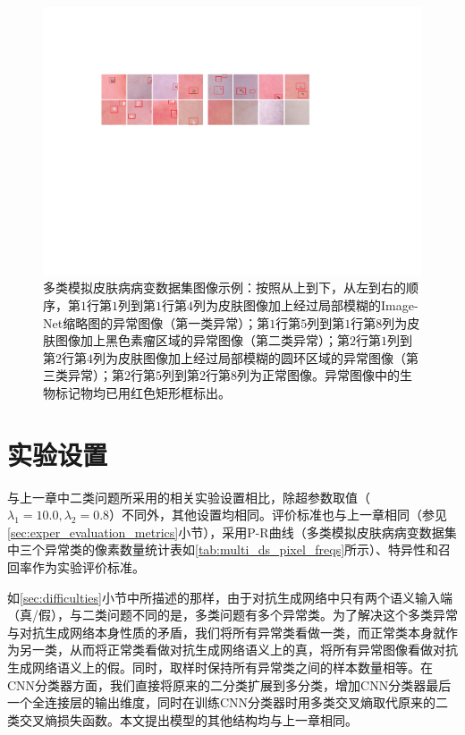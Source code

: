 \begin{figure}[h]
	\centering
	\includegraphics[width=1.0\textwidth]{figure/multi_classes_simulated_skin.pdf}
	\caption{多类模拟皮肤病病变数据集图像示例：按照从上到下，从左到右的顺序，第$1$行第$1$列到第$1$行第$4$列为皮肤图像加上经过局部模糊的Image-Net缩略图的异常图像（第一类异常）；第$1$行第$5$列到第$1$行第$8$列为皮肤图像加上黑色素瘤区域的异常图像（第二类异常）；第$2$行第$1$列到第$2$行第$4$列为皮肤图像加上经过局部模糊的圆环区域的异常图像（第三类异常）；第$2$行第$5$列到第$2$行第$8$列为正常图像。异常图像中的生物标记物均已用红色矩形框标出。}
	\label{fig:mul_classes_simulated_ds}
\end{figure}

\section{实验设置}\label{sec:multi_classes_experiment_setting}
与上一章中二类问题所采用的相关实验设置相比，除超参数取值（$\lambda_{1}=10.0,\lambda_{2}=0.8$）不同外，其他设置均相同。评价标准也与上一章相同（参见\ref{sec:exper_evaluation_metrics}小节），采用P-R曲线（多类模拟皮肤病病变数据集中三个异常类的像素数量统计表如\ref{tab:multi_ds_pixel_freqs}所示）、特异性和召回率作为实验评价标准。

如\ref{sec:difficulties}小节中所描述的那样，由于对抗生成网络中只有两个语义输入端（真/假），与二类问题不同的是，多类问题有多个异常类。为了解决这个多类异常与对抗生成网络本身性质的矛盾，我们将所有异常类看做一类，而正常类本身就作为另一类，从而将正常类看做对抗生成网络语义上的真，将所有异常图像看做对抗生成网络语义上的假。同时，取样时保持所有异常类之间的样本数量相等。在CNN分类器方面，我们直接将原来的二分类扩展到多分类，增加CNN分类器最后一个全连接层的输出维度，同时在训练CNN分类器时用多类交叉熵取代原来的二类交叉熵损失函数。本文提出模型的其他结构均与上一章相同。

